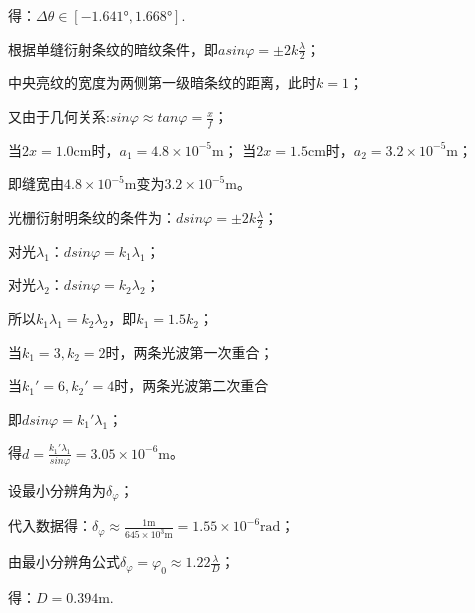 得：$\Delta\theta\in[-1.641°,1.668°]$.

\exercise

\solve
根据单缝衍射条纹的暗纹条件，即$asin\varphi=\pm2k\frac{\lambda}{2}$；

中央亮纹的宽度为两侧第一级暗条纹的距离，此时$k=1$；

又由于几何关系:$sin\varphi\approx tan\varphi=\frac{x}{f}$；

当$2x=1.0\mathrm{cm}$时，$a_1=4.8\times10^{-5}\mathrm{m}$；
当$2x=1.5\mathrm{cm}$时，$a_2=3.2\times10^{-5}\mathrm{m}$；

即缝宽由$4.8\times10^{-5}\mathrm{m}$变为$3.2\times10^{-5}\mathrm{m}$。

\exercise

\solve
光栅衍射明条纹的条件为：$dsin\varphi=\pm2k\frac{\lambda}{2}$；

对光$\lambda_1$：$dsin\varphi=k_1\lambda_1$；

对光$\lambda_2$：$dsin\varphi=k_2\lambda_2$；

所以$k_1\lambda_1=k_2\lambda_2$，即$k_1=1.5k_2$；

当$k_1=3,k_2=2$时，两条光波第一次重合；

当$k_1'=6,k_2'=4$时，两条光波第二次重合

即$dsin\varphi=k_1'\lambda_1$；

得$d=\frac{k_1'\lambda_1}{sin\varphi}=3.05\times10^{-6}\mathrm{m}$。

\exercise

\solve
设最小分辨角为$\delta_\varphi$；

代入数据得：$\delta_\varphi\approx\frac{1\mathrm{m}}{645\times10^{3}\mathrm{m}}=1.55\times10^{-6}\mathrm{rad}$；

由最小分辨角公式$\delta_\varphi=\varphi_0\approx1.22\frac{\lambda}{D}$；

得：$D=0.394\mathrm{m}$.
